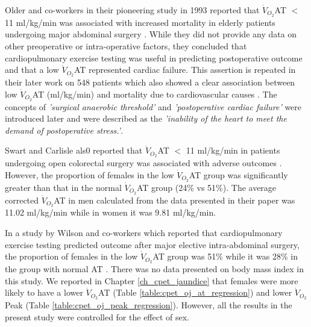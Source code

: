 Older and co-workers in their pioneering study in 1993 reported that $\dot{V}_{O_2}$AT $<$ 11 ml/kg/min was associated with increased mortality in elderly patients undergoing major abdominal surgery \parencite{older_preoperative_1993}. 
While they did not provide any data on other preoperative or intra-operative factors, they concluded that cardiopulmonary exercise testing was useful in predicting postoperative outcome and that a low $\dot{V}_{O_2}$AT represented cardiac failure. 
This assertion is repeated in their later work on 548 patients which also showed a clear association between low $\dot{V}_{O_2}$AT (ml/kg/min) and mortality due to cardiovascular causes \parencite{older_cardiopulmonary_1999}. 
The concepts of \textit{'surgical anaerobic threshold'} and \textit{'postoperative cardiac failure'} were introduced later and were described as the \textit{'inability of the heart to meet the demand of postoperative stress.'}\parencite{society_ats/accp_2003}.

Swart and Carlisle als0 reported that $\dot{V}_{O_2}$AT $<$ 11 ml/kg/min in patients undergoing open colorectal surgery was associated with adverse outcomes \parencite{swart_case-controlled_2012}. 
However, the proportion of females in the low $\dot{V}_{O_2}$AT group was significantly greater than that in the normal $\dot{V}_{O_2}$AT group (24\% vs 51\%). 
The average corrected $\dot{V}_{O_2}$AT in men calculated from the data presented in their paper was 11.02 ml/kg/min while in women it was 9.81 ml/kg/min. 

In a study by Wilson and co-workers which reported that cardiopulmonary exercise testing predicted outcome after major elective intra-abdominal surgery, the proportion of females in the low $\dot{V}_{O_2}$AT group was 51\% while it was 28\% in the group with normal AT \parencite{wilson_impaired_2010}. 
There was no data presented on body mass index in this study. 
We reported in Chapter \ref{ch_cpet_jaundice} that females were more likely to have a lower $\dot{V}_{O_2}$AT (Table \ref{table:cpet_oj_at_regression}) and lower $\dot{V}_{O_2}$Peak (Table \ref{table:cpet_oj_peak_regression}). 
However, all the results in the present study were controlled for the effect of sex. 

